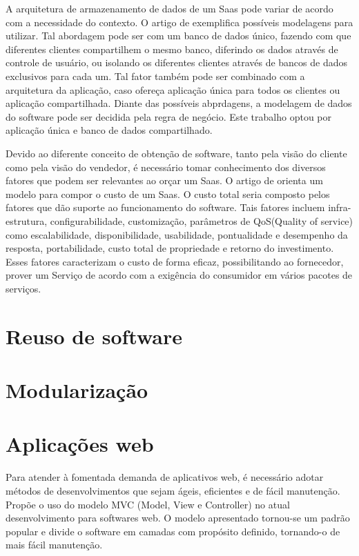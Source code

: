 A arquitetura de armazenamento de dados de um Saas pode variar de acordo com a necessidade do contexto. O artigo de \citep{7586486} exemplifica possíveis modelagens para utilizar. Tal abordagem pode ser com um banco de dados único, fazendo com que diferentes clientes compartilhem o mesmo banco, diferindo os dados através de controle de usuário, ou isolando os diferentes clientes através de bancos de dados exclusivos para cada um. Tal fator também pode ser combinado com a arquitetura da aplicação, caso ofereça aplicação única para todos os clientes ou aplicação compartilhada. Diante das possíveis abprdagens, a modelagem de dados do software pode ser decidida pela regra de negócio. Este trabalho optou por aplicação única e banco de dados compartilhado.


Devido ao diferente conceito de obtenção de software, tanto pela visão do cliente como pela visão do vendedor, é necessário tomar conhecimento dos diversos fatores que podem ser relevantes ao orçar um Saas. O artigo de \citep{6949281} orienta um modelo para compor o custo de um Saas. O custo total seria composto pelos fatores que dão suporte ao funcionamento do software. Tais fatores incluem infra-estrutura, configurabilidade, customização, parâmetros de QoS(Quality of service) como escalabilidade, disponibilidade, usabilidade, pontualidade e desempenho da resposta, portabilidade, custo total de propriedade e retorno do investimento. Esses fatores caracterizam o custo de forma eficaz, possibilitando ao fornecedor, prover um Serviço de acordo com a exigência do consumidor em vários pacotes de serviços.


\section{Reuso de software}\label{sec:reuso}


\section{Modularização}\label{sec:modularizacao}


\section{Aplicações web}\label{sec:apps_web}


Para atender à fomentada demanda de aplicativos web, é necessário adotar métodos de desenvolvimentos que sejam ágeis, eficientes e de fácil manutenção. \cite{1372143} Propõe o uso do modelo MVC (Model, View e Controller) no atual desenvolvimento para softwares web. O modelo apresentado tornou-se um padrão popular e divide o software em camadas com propósito definido, tornando-o de mais fácil manutenção.

